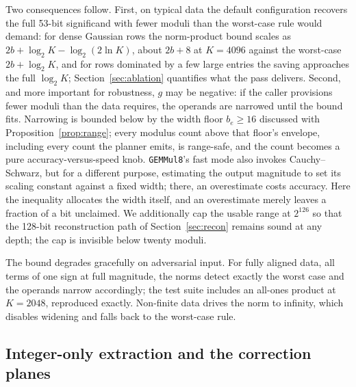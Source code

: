 \documentclass[11pt]{amsart}
\theoremstyle{plain}
\theoremstyle{definition}
\newcommand{\code}[1]{\texttt{#1}}
\newcommand{\gemmul}{\code{GEMMul8}}
\begin{document}
Two consequences follow. First, on typical data the default configuration
recovers the full 53-bit significand with fewer moduli than the worst-case
rule would demand: for dense Gaussian rows the norm-product bound scales
as $2b + \log_2 K - \log_2(2 \ln K)$, about $2b + 8$ at $K = 4096$
against the worst-case $2b + \log_2 K$, and for rows dominated by a few
large entries the saving approaches the full $\log_2 K$;
Section~\ref{sec:ablation} quantifies what the pass delivers. Second, and
more important for robustness, $g$ may be negative: if the caller
provisions fewer moduli than the data requires, the operands are narrowed
until the bound fits. Narrowing is bounded below by the width floor
$b_e \ge 16$ discussed with Proposition~\ref{prop:range}; every modulus
count above that floor's envelope, including every count the planner
emits, is range-safe, and the count becomes a pure
accuracy-versus-speed knob. \gemmul{}'s fast
mode also invokes Cauchy--Schwarz, but for a different purpose, estimating
the output magnitude to set its scaling constant against a fixed width;
there, an overestimate costs accuracy. Here the inequality allocates the
width itself, and an overestimate merely leaves a fraction of a bit
unclaimed. We additionally cap the usable range at $2^{126}$ so that the
128-bit reconstruction path of Section~\ref{sec:recon} remains sound at
any depth; the cap is invisible below twenty moduli.

The bound degrades gracefully on adversarial input. For fully aligned
data, all terms of one sign at full magnitude, the norms detect exactly
the worst case and the operands narrow accordingly; the test suite
includes an all-ones product at $K = 2048$, reproduced exactly.
Non-finite data drives the norm to
infinity, which disables widening and falls back to the worst-case rule.

\subsection{Integer-only extraction and the correction planes}\label{sec:extract}
\end{document}
